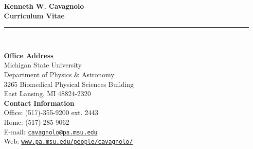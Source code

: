 \documentclass[12pt]{cv}
\begin{document}
\begin{center}
{\huge \textbf{\sc Kenneth W. Cavagnolo\\ \large Curriculum Vitae}}\\
\rule{17.35cm}{1pt}\\
\end{center}
\normalsize

\addresses
{
{\bf Office Address}\\
Michigan State University\\
Department of Physics \& Astronomy\\
3265 Biomedical Physical Sciences Building\\
East Lansing, MI 48824-2320\\
}
{
{\bf Contact Information}\\
Office: (517)-355-9200 ext. 2443\\
Home: (517)-285-9062\\
E-mail: \href{mailto:cavagnolo@pa.msu.edu}{\tt{cavagnolo@pa.msu.edu}}\\
Web: \href{http://www.pa.msu.edu/people/cavagnolo/}{\tt www.pa.msu.edu/people/cavagnolo/}\\
}
\end{document}
